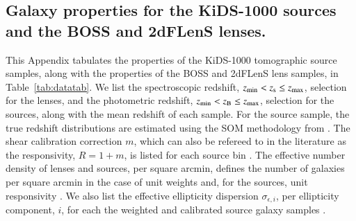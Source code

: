 \begin{appendix} 
\section{Galaxy properties for the KiDS-1000 sources and the BOSS and 2dFLenS lenses.}
\label{app:properties}

This Appendix tabulates the properties of the KiDS-1000 tomographic source samples, along with the properties of the BOSS and 2dFLenS lens samples, in Table~\ref{tab:datatab}.   We list the spectroscopic redshift, $z_{\rm min} < z_{\rm s} \leq z_{\rm max}$, selection for the lenses, and the photometric redshift, $z_{\rm min} < z_{\rm B} \leq z_{\rm max}$, selection for the sources, along with the mean redshift of each sample.  For the source sample, the true redshift distributions are estimated using the SOM methodology from \citet{wright/etal:2020}.     The shear calibration correction $m$, which can also be refereed to in the literature as the responsivity, $R = 1+m$, is listed for each source bin \citep{kannawadi/etal:2019}.  The effective number density of lenses and sources, per square arcmin,  defines the number of galaxies per square arcmin in the case of unit weights and, for the sources, unit responsivity \citep[see equations C.11 and C.13 in][]{joachimi/etal:inprep}.  We also list the  effective ellipticity dispersion $\sigma_{\epsilon,i}$, per ellipticity component, $i$, for each the weighted and calibrated source galaxy samples \citep[equation C.8 in][]{joachimi/etal:inprep}.


\end{appendix}
